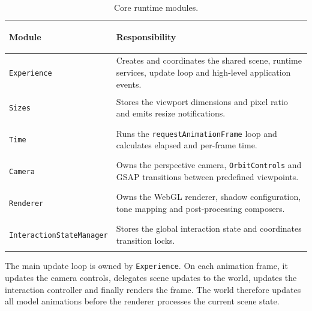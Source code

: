 \documentclass{report}
\begin{document}
\begin{table}[ht]
    \centering
    \small
    \setlength{\tabcolsep}{7pt}
    \renewcommand{\arraystretch}{1.22}

    \begin{tabularx}{\textwidth}{
        @{}
        >{\bfseries\raggedright\arraybackslash}p{}
        >{\raggedright\arraybackslash}X
        @{}
    }
        \toprule
        Module & Responsibility \\
        \midrule

        \texttt{Experience}
        &
        Creates and coordinates the shared scene, runtime services,
        update loop and high-level application events.
        \\

        \texttt{Sizes}
        &
        Stores the viewport dimensions and pixel ratio and emits resize
        notifications.
        \\

        \texttt{Time}
        &
        Runs the \texttt{requestAnimationFrame} loop and calculates
        elapsed and per-frame time.
        \\

        \texttt{Camera}
        &
        Owns the perspective camera, \texttt{OrbitControls} and GSAP
        transitions between predefined viewpoints.
        \\

        \texttt{Renderer}
        &
        Owns the WebGL renderer, shadow configuration, tone mapping and
        post-processing composers.
        \\

        \texttt{InteractionStateManager}
        &
        Stores the global interaction state and coordinates transition
        locks.
        \\

        \bottomrule
    \end{tabularx}

    \caption{Core runtime modules.}
    \label{tab:core-runtime-modules}
\end{table}

The main update loop is owned by \texttt{Experience}. On each animation
frame, it updates the camera controls, delegates scene updates to the
world, updates the interaction controller and finally renders the
frame. The world therefore updates all model animations before the
renderer processes the current scene state.
\end{document}
